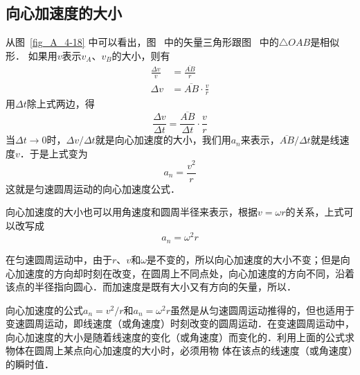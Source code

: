 \subsection{向心加速度的大小} 



从图~\ref{fig_A_4-18} 中可以看出，图~ 中的矢量三角形跟图~ 中的$\triangle OAB$是相似形．
如果用$v$表示$v_A$、$v_B$的大小，则有
\[\begin{split}
\frac{\Delta v}{v}&=\frac{\overline{AB}}{r}\\
\Delta v &= \overline{AB}\cdot \frac{v}{r}
\end{split} \]
用$\Delta t$除上式两边，得
\[\frac{\Delta v}{\Delta t}=\frac{\overline{AB}}{\Delta t}\cdot \frac{v}{r} \]
当$\Delta t\to 0$时，$\Delta v/\Delta t$就是向心加速度的大小，我们用$a_n$来表示，$\overline{AB}/\Delta t$就是线速度$v$．于是上式变为
\[a_n=\frac{v^2}{r} \]
这就是匀速圆周运动的向心加速度公式．

向心加速度的大小也可以用角速度和圆周半径来表示，根据$v=\omega r$的关系，上式可以改写成
\[a_n=\omega^2 r \]

在匀速圆周运动中，由于$r$、$v$和$\omega$是不变的，所以向心加速度的大小不变；但是向心加速度的方向却时刻在改变，在圆周上不同点处，向心加速度的方向不同，沿着该点的半径指向圆心．而加速度是既有大小又有方向的矢量，所以．

向心加速度的公式$a_n=v^2/r$和$a_n=\omega^2 r$虽然是从匀速圆周运动推得的，但也适用于变速圆周运动，即线速度（或角速度）时刻改变的圆周运动．在变速圆周运动中，向心加速度的大小是随着线速度的变化（或角速度）而变化的．利用上面的公式求物体在圆周上某点向心加速度的大小时，必须用物
体在该点的线速度（或角速度）的瞬时值．


